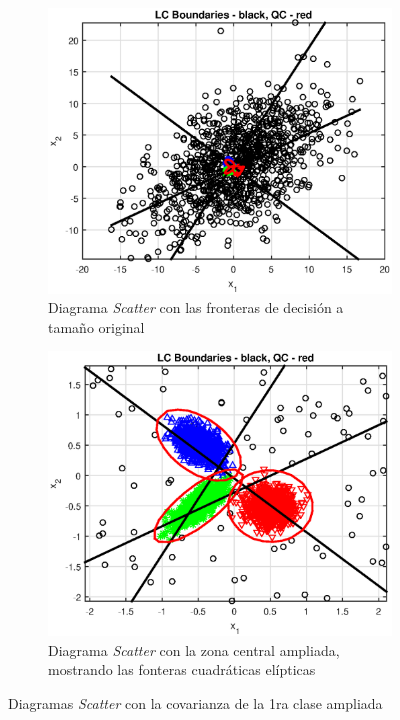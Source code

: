 \documentclass[11pt]{article} %
\begin{document}
\begin{figure}[h]
	\centering
	\begin{subfigure}[b]{0.475 \textwidth}
		\centering
		\includegraphics[width=\textwidth]{../Part_2/caso3_sigma30_nozoom.eps}
		\caption[]{\small Diagrama \emph{Scatter} con las fronteras de decisión a tamaño original}
		\label{fig:c3:mult:nozoom}
	\end{subfigure}
	\quad
	\begin{subfigure}[b]{0.475 \textwidth}
		\centering
		\includegraphics[width=\textwidth]{../Part_2/caso3_sigma30_zoom.eps}
		\caption[]{\small Diagrama \emph{Scatter} con la zona central ampliada, mostrando las fonteras cuadráticas elípticas} 
		\label{fig:c3:mult:zoom}
	\end{subfigure}
	\caption{Diagramas \emph{Scatter} con la covarianza de la 1ra clase ampliada}
	\label{fig:c3:mult}
\end{figure}
\end{document}
